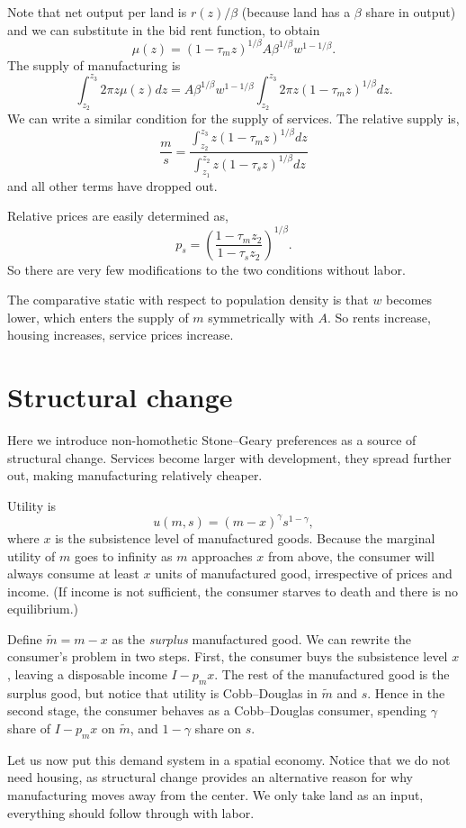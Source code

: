 \documentclass[letter]{amsart}
\theoremstyle{definition}
\theoremstyle{remark}
\numberwithin{equation}{section}
\begin{document}
Note that net output per land is $r(z)/\beta$ (because land has a $\beta$ share in output) and we can substitute in the bid rent function, to obtain
\[
\mu(z) = (1-\tau_m z)^{1/\beta}A {\beta}^{1/\beta}w^{1-1/\beta}.
\]
The supply of manufacturing is
\[
\int_{z_2}^{z_3} 2\pi z\mu(z) dz = A {\beta}^{1/\beta}w^{1-1/\beta}\int_{z_2}^{z_3} 2\pi z(1-\tau_m z)^{1/\beta} dz.
\]
We can write a similar condition for the supply of services. The relative supply is,
\[
\frac ms = \frac{\int_{z_2}^{z_3} z(1-\tau_m z)^{1/\beta} dz}{\int_{z_1}^{z_2} z(1-\tau_s z)^{1/\beta} dz}
\]
and all other terms have dropped out.

Relative prices are easily determined as,
\[
p_s = \left(\frac{1-\tau_m z_2}{1-\tau_s z_2}\right)^{1/\beta}.
\]
So there are very few modifications to the two conditions without labor.

The comparative static with respect to population density is that $w$ becomes lower, which enters the supply of $m$ symmetrically with $A$. So rents increase, housing increases, service prices increase.

\section{Structural change}
Here we introduce non-homothetic Stone--Geary preferences as a source of structural change. Services become larger with development, they spread further out, making manufacturing relatively cheaper.

Utility is
\[
u(m,s) = (m-x)^\gamma s^{1-\gamma},
\]
where $x$ is the subsistence level of manufactured goods. Because the marginal utility of $m$ goes to infinity as $m$ approaches $x$ from above, the consumer will always consume at least $x$ units of manufactured good, irrespective of prices and income. (If income is not sufficient, the consumer starves to death and there is no equilibrium.)

Define $\tilde m=m-x$ as the \emph{surplus} manufactured good. We can rewrite the consumer's problem in two steps. First, the consumer buys the subsistence level $x$, leaving a disposable income $I-p_m x$. The rest of the manufactured good is the surplus good, but notice that utility is Cobb--Douglas in $\tilde m$ and $s$. Hence in the second stage, the consumer behaves as a Cobb--Douglas consumer, spending $\gamma$ share of $I-p_m x$ on $\tilde m$, and $1-\gamma$ share on $s$.

Let us now put this demand system in a spatial economy. Notice that we do not need housing, as structural change provides an alternative reason for why manufacturing moves away from the center. We only take land as an input, everything should follow through with labor.
\end{document}

